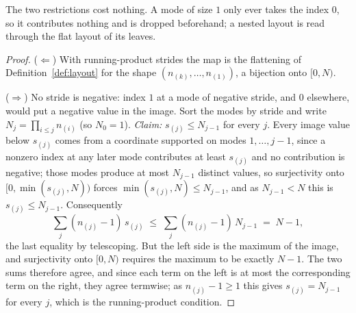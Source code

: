The two restrictions cost nothing. A mode of size $1$ only ever takes the
index $0$, so it contributes nothing and is dropped beforehand; a nested layout
is read through the flat layout of its leaves.

\begin{proof}
($\Leftarrow$) With running-product strides the map is the flattening of
Definition~\ref{def:layout} for the shape $(n_{(k)},\dots,n_{(1)})$, a
bijection onto $[0,N)$.

($\Rightarrow$) No stride is negative: index $1$ at a mode of negative stride,
and $0$ elsewhere, would put a negative value in the image. Sort the modes by
stride and write $N_j = \prod_{i \le j} n_{(i)}$
(so $N_0 = 1$). \emph{Claim:} $s_{(j)} \le N_{j-1}$ for every $j$. Every image
value below $s_{(j)}$ comes from a coordinate supported on modes
$1,\dots,j{-}1$, since a nonzero index at any later mode contributes at
least $s_{(j)}$ and no contribution is negative; those modes produce at
most $N_{j-1}$ distinct values, so surjectivity onto
$[0,\min(s_{(j)},N))$ forces $\min(s_{(j)},N) \le N_{j-1}$, and as
$N_{j-1} < N$ this is $s_{(j)} \le N_{j-1}$. Consequently
\[
\textstyle\sum_j (n_{(j)}-1)\,s_{(j)} \;\le\; \sum_j (n_{(j)}-1)\,N_{j-1}
\;=\; N - 1,
\]
the last equality by telescoping. But the left side is the maximum of the
image, and surjectivity onto $[0,N)$ requires the maximum to be exactly
$N-1$. The two sums therefore agree, and since each term on the left is at most
the corresponding term on the right, they agree termwise; as
$n_{(j)} - 1 \ge 1$ this gives $s_{(j)} = N_{j-1}$ for every $j$, which is the
running-product condition.
\end{proof}
